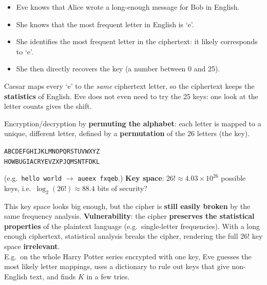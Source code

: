 \begin{defnbox}[title=Frequency analysis attack]
\begin{itemize}
  \item Eve knows that Alice wrote a long-enough message for Bob in English.
  \item She knows that the most frequent letter in English is `e'.
  \item She identifies the most frequent letter in the ciphertext: it likely corresponds
        to `e'.
  \item She then directly recovers the key (a number between 0 and 25).
\end{itemize}
\end{defnbox}

\begin{rembox}[title=Why it works]
Caesar maps every `e' to the \emph{same} ciphertext letter, so the ciphertext keeps the
\textbf{statistics} of English. Eve does not even need to try the 25 keys: one look at the
letter counts gives the shift.
\end{rembox}

\begin{defnbox}[title=Substitution cipher]
Encryption/decryption by \textbf{permuting the alphabet}: each letter is mapped to a
unique, different letter, defined by a \textbf{permutation} of the 26 letters (the key).
\begin{center}
\texttt{ABCDEFGHIJKLMNOPQRSTUVWXYZ} \\
\texttt{HOWBUGIACRYEVZXPJQMSNTFDKL}
\end{center}
(e.g.\ \texttt{hello world} $\to$ \texttt{aueex fxqeb}.)
\textbf{Key space}: $26! \approx 4.03 \times 10^{26}$ possible keys, i.e.\
$\log_2(26!) \approx 88.4$ bits of security?
\end{defnbox}

\begin{warnbox}[title={The flaw, again}]
This key space looks big enough, but the cipher is \textbf{still easily broken} by the
same frequency analysis. \textbf{Vulnerability}: the cipher \textbf{preserves the
statistical properties} of the plaintext language (e.g.\ single-letter frequencies). With
a long enough ciphertext, statistical analysis breaks the cipher, rendering the full $26!$
key space \textbf{irrelevant}. \\
E.g.\ on the whole Harry Potter series encrypted with one key, Eve guesses the most
likely letter mappings, uses a dictionary to rule out keys that give non-English text,
and finds $K$ in a few tries.
\end{warnbox}

